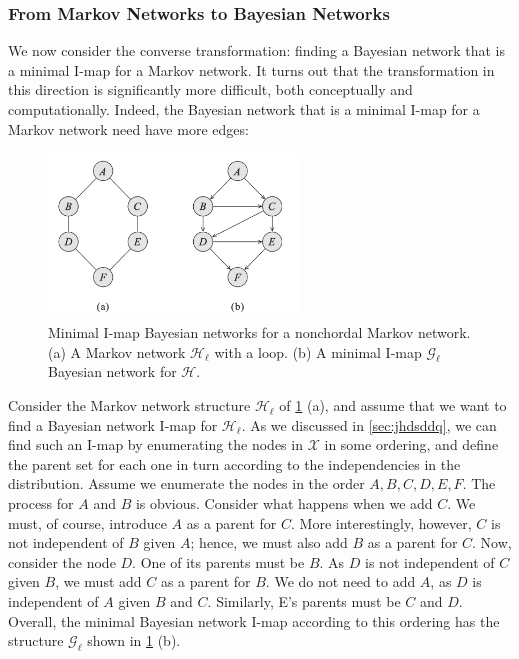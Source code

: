 \documentclass{article}
\begin{document}
\subsubsection{From Markov Networks to Bayesian Networks}
We now consider the converse transformation: finding a Bayesian network that is a minimal I-map for a Markov network. It turns out that the transformation in this direction is significantly more difficult, both conceptually and computationally. Indeed, the Bayesian network that is a minimal I-map for a Markov network need have more edges:  
\begin{exma}
\begin{figure}[H]
    \centering
    \includegraphics[width=0.6\textwidth]{Figs/a20.png}
    \caption{Minimal I-map Bayesian networks for a nonchordal Markov network.
(a) A Markov network $\mathcal{H}_{\ell}$ with a loop. (b) A minimal I-map $\mathcal{G}_{\ell}$ Bayesian network for $\mathcal{H}$.}
    \label{fig:zcvdnjf}
\end{figure}
Consider the Markov network structure $\mathcal{H}_{\ell}$ of \cref{fig:zcvdnjf} (a), and assume that we want to find a Bayesian network I-map for $\mathcal{H}_{\ell}$. As we discussed in \cref{sec:jhdsddq}, we can find such an I-map by enumerating the nodes in $\mathcal{X}$ in some ordering, and define the parent set for each one in turn according to the independencies in the distribution. Assume we enumerate the nodes in the order $A, B, C, D, E, F$. The process for $A$ and $B$ is obvious. Consider what happens when we add $C$. We must, of course, introduce $A$ as a parent for $C$. More interestingly, however, $C$ is not independent of $B$ given $A$; hence, we must also add $B$ as a parent for $C$. Now, consider the node $D$. One of its parents must be $B$. As $D$ is not independent of $C$ given $B$, we must add $C$ as a parent for $B$. We do not need to add $A$, as $D$ is independent of $A$ given $B$ and $C$. Similarly, E's parents must be $C$ and $D$. Overall, the minimal Bayesian network I-map according to this ordering has the structure $\mathcal{G}_{\ell}$ shown in \cref{fig:zcvdnjf} (b).
\end{exma}
\end{document}
